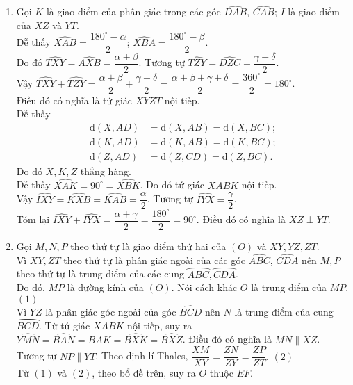 \begin{bt}
{\begin{center}
\end{center}
\begin{enumerate}
	\item Gọi $K$ là giao điểm của phân giác trong các góc $\widehat{DAB}$, $\widehat{CAB}$; $I$ là giao điểm của $XZ$ và $YT$.
	\\ Dễ thấy $\widehat{XAB}=\dfrac{180^\circ -\alpha}{2}$; $\widehat{XBA} = \dfrac{180^\circ -\beta}{2}$. 
	\\ Do đó $\widehat{TXY} = \widehat{AXB} =\dfrac{\alpha+ \beta}{2}$. Tương tự $\widehat{TZY} =\widehat{DZC}=\dfrac{\gamma +\delta}{2}$.
	\\ Vậy $\widehat{TXY} + \widehat{TZY} =\dfrac{\alpha +\beta}{2} + \dfrac{\gamma + \delta}{2} = \dfrac{\alpha + \beta + \gamma + \delta }{2} =\dfrac{360^\circ}{2}=180^\circ$.
	\\ Điều đó có nghĩa là tứ giác $XYZT$ nội tiếp.
	\\ Dễ thấy 
	{\allowdisplaybreaks
	\begin{align*}
	\mathrm{d}(X,AD) &= \mathrm{d}(X,AB) = \mathrm{d}(X,BC); \\ 
	\mathrm{d}(K,AD) &= \mathrm{d}(K,AB) = \mathrm{d}(K,BC); \\ 
	\mathrm{d}(Z,AD) &= \mathrm{d}(Z,CD) = \mathrm{d}(Z,BC).
	\end{align*}}Do đó $X,K,Z$ thẳng hàng.
	\\ Dễ thấy $\widehat{XAK} =90^\circ =\widehat{XBK}$. Do đó tứ giác $XABK$ nội tiếp. 
	\\ Vậy $\widehat{IXY} =\widehat{KXB} =\widehat{KAB} =\dfrac{\alpha}{2}$. Tương tự $\widehat{IYX}= \dfrac{\gamma}{2}$. 
	\\ Tóm lại $\widehat{IXY} +\widehat{IYX} =\dfrac{\alpha +\gamma}{2} =\dfrac{180^\circ}{2}=90^\circ$. Điều đó có nghĩa là $XZ \perp YT$.
	\item Gọi $M,N,P$ theo thứ tự là giao điểm thứ hai của $(O)$ và $XY,YZ,ZT$.
	\\ Vì $XY,ZT$ theo thứ tự là phân giác ngoài của các góc $\widehat{ABC}$, $\widehat{CDA}$ nên $M,P$ theo thứ tự là trung điểm của các cung  $\wideparen{ABC}, \wideparen{CDA}$.
	\\ Do đó, $MP$ là đường kính của $(O)$. Nói cách khác $O$ là trung điểm của $MP$. \hfill $(1)$
	\\ Vì $YZ$ là phân giác góc ngoài của góc $\widehat{BCD}$ nên $N$ là trung điểm của cung $\wideparen{BCD}$. Từ tứ giác $XABK$ nội tiếp, suy ra $\widehat{YMN} = \widehat{BAN} =\widehat{BAK} =\widehat{BXK}= \widehat{BXZ}$. Điều đó có nghĩa là $MN \parallel XZ$. Tương tự $NP \parallel YT$. Theo định lí Thales, $\dfrac{XM}{XY}= \dfrac{ZN}{ZY} =\dfrac{ZP}{ZT}.$ \hfill $(2)$
	\\ Từ $(1)$ và $(2)$, theo bổ đề trên, suy ra $O$ thuộc $EF$.
\end{enumerate}
}
\end{bt}

